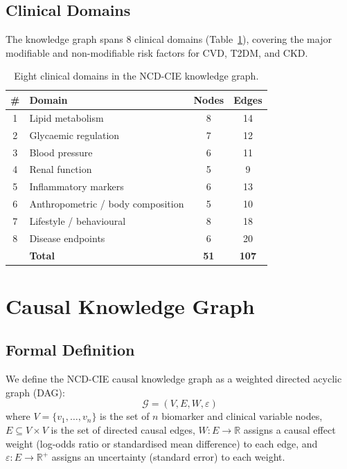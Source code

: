 \documentclass[runningheads]{llncs}
\begin{document}
\subsection{Clinical Domains}\label{sec:domains}

The knowledge graph spans 8 clinical domains (Table~\ref{tab:domains}),
covering the major modifiable and non-modifiable risk factors for CVD,
T2DM, and CKD.

\begin{table}[t]
\centering
\caption{Eight clinical domains in the NCD-CIE knowledge graph.}
\label{tab:domains}
\small
\begin{tabular}{@{}clcc@{}}
\toprule
\textbf{\#} & \textbf{Domain} & \textbf{Nodes} & \textbf{Edges} \\
\midrule
1 & Lipid metabolism        & 8  & 14 \\
2 & Glycaemic regulation    & 7  & 12 \\
3 & Blood pressure          & 6  & 11 \\
4 & Renal function          & 5  & 9  \\
5 & Inflammatory markers    & 6  & 13 \\
6 & Anthropometric / body composition & 5 & 10 \\
7 & Lifestyle / behavioural & 8  & 18 \\
8 & Disease endpoints       & 6  & 20 \\
\midrule
  & \textbf{Total}          & \textbf{51} & \textbf{107} \\
\bottomrule
\end{tabular}
\end{table}

\section{Causal Knowledge Graph}\label{sec:kg}

\subsection{Formal Definition}\label{sec:formal}

We define the NCD-CIE causal knowledge graph as a weighted directed
acyclic graph (DAG):
\begin{equation}\label{eq:graph}
\mathcal{G} = (V, E, W, \varepsilon)
\end{equation}
where $V=\{v_1,\ldots,v_n\}$ is the set of $n$ biomarker and clinical
variable nodes, $E \subseteq V \times V$ is the set of directed causal
edges, $W: E \rightarrow \mathbb{R}$ assigns a causal effect weight
(log-odds ratio or standardised mean difference) to each edge, and
$\varepsilon: E \rightarrow \mathbb{R}^+$ assigns an uncertainty
(standard error) to each weight.
\end{document}
